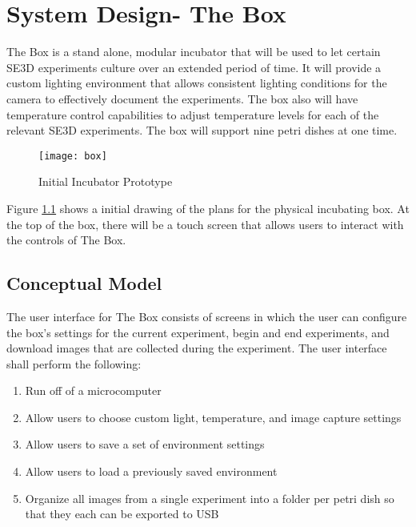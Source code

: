 \chapter{System Design- The Box}

The Box is a stand alone, modular incubator that will be used to let certain SE3D experiments culture over an extended period of time. It will provide a custom lighting environment that allows consistent lighting conditions for the camera to effectively document the experiments. The box also will have temperature control capabilities to adjust temperature levels for each of the relevant SE3D experiments. The box will support nine petri dishes at one time.

\begin{figure}[H]
\texttt{[image: box]}
\caption{\label{figure:box} Initial Incubator Prototype}
\end{figure}

Figure \ref{figure:box} shows a initial drawing of the plans for the physical incubating box. At the top of the box, there will be a touch screen that allows users to interact with the controls of The Box.





\section{Conceptual Model}

The user interface for The Box consists of screens in which the user can configure the box’s settings for the current experiment, begin and end experiments, and download images that are collected during the experiment. The user interface shall perform the following: 

\begin{enumerate}
	\item	Run off of a microcomputer
	\item	Allow users to choose custom light, temperature, and image capture settings
	\item   Allow users to save a set of environment settings
	\item	Allow users to load a previously saved environment 
	\item	Organize all images from a single experiment into a folder per petri dish so that they each can be exported to USB 

\end{enumerate}

